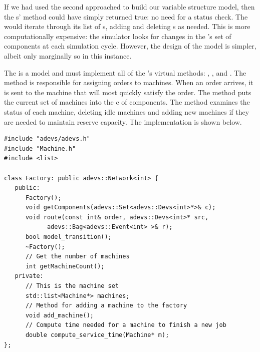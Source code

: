 If we had used the second approached to build our variable structure model, then the s'  method could have simply returned true: no need for a status check. The  would iterate through its list of s, adding and deleting s as needed. This is more computationally expensive: the simulator looks for changes in the 's set of components at each simulation cycle. However, the design of the model is simpler, albeit only marginally so in this instance.

The  is a  model and must implement all of the 's virtual methods: , , and . The  method is responsible for assigning orders to machines. When an order arrives, it is sent to the machine that will most quickly satisfy the order. The  method puts the current set of machines into the  c of components. The  method examines the status of each machine, deleting idle machines and adding new machines if they are needed to maintain reserve capacity. The  implementation is shown below.
\begin{verbatim}
#include "adevs/adevs.h"
#include "Machine.h"
#include <list>

class Factory: public adevs::Network<int> {
   public:
      Factory();
      void getComponents(adevs::Set<adevs::Devs<int>*>& c);
      void route(const int& order, adevs::Devs<int>* src,
            adevs::Bag<adevs::Event<int> >& r);
      bool model_transition();
      ~Factory();
      // Get the number of machines
      int getMachineCount();
   private:
      // This is the machine set
      std::list<Machine*> machines;
      // Method for adding a machine to the factory
      void add_machine();
      // Compute time needed for a machine to finish a new job
      double compute_service_time(Machine* m);
};
\end{verbatim}
